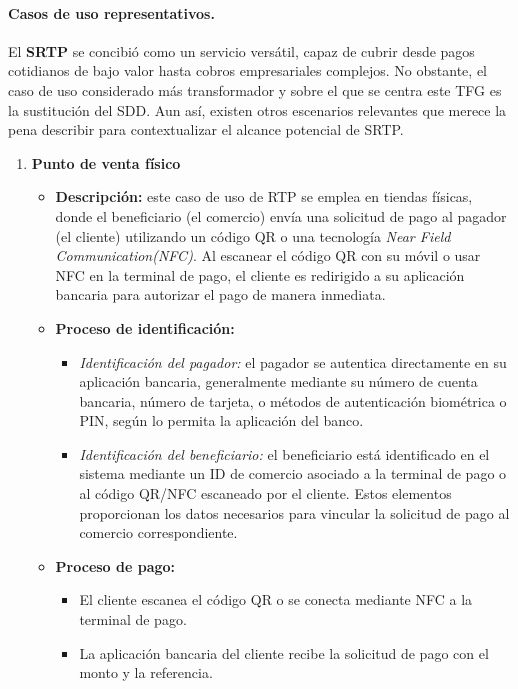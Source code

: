 \paragraph{Casos de uso representativos.}
El \textbf{SRTP} se concibió como un servicio versátil, capaz de cubrir desde pagos cotidianos de bajo valor hasta cobros empresariales complejos. No obstante, el caso de uso considerado más transformador y sobre el que se centra este TFG es la sustitución del SDD. Aun así, existen otros escenarios relevantes que merece la pena describir para contextualizar el alcance potencial de SRTP.

\begin{enumerate}
    \item \textbf{Punto de venta físico}
    \begin{itemize}
        \item \textbf{Descripción:} este caso de uso de RTP se emplea en tiendas físicas, donde el beneficiario (el comercio) envía una solicitud de pago al pagador (el cliente) utilizando un código QR o una tecnología \textit{Near Field Communication(NFC)}. Al escanear el código QR con su móvil o usar NFC en la terminal de pago, el cliente es redirigido a su aplicación bancaria para autorizar el pago de manera inmediata.
        \item \textbf{Proceso de identificación:}
        \begin{itemize}
            \item \textit{Identificación del pagador:} el pagador se autentica directamente en su aplicación bancaria, generalmente mediante su número de cuenta bancaria, número de tarjeta, o métodos de autenticación biométrica o PIN, según lo permita la aplicación del banco.
            \item \textit{Identificación del beneficiario:} el beneficiario está identificado en el sistema mediante un ID de comercio asociado a la terminal de pago o al código QR/NFC escaneado por el cliente. Estos elementos proporcionan los datos necesarios para vincular la solicitud de pago al comercio correspondiente.
        \end{itemize}
        \item \textbf{Proceso de pago:}
        \begin{itemize}
            \item El cliente escanea el código QR o se conecta mediante NFC a la terminal de pago.
            \item La aplicación bancaria del cliente recibe la solicitud de pago con el monto y la referencia.

\end{itemize}
\end{itemize}
\end{enumerate}
